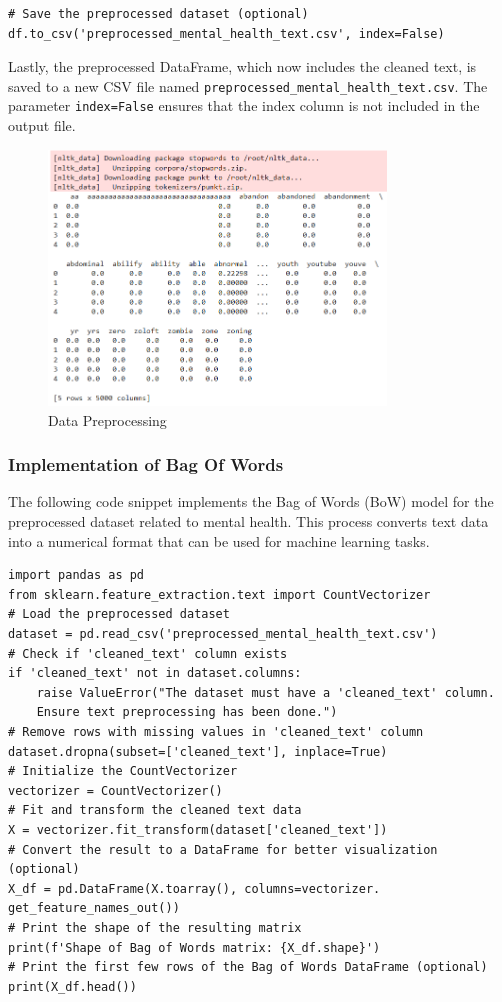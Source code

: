 \begin{verbatim}
# Save the preprocessed dataset (optional)
df.to_csv('preprocessed_mental_health_text.csv', index=False)
\end{verbatim}

\noindent
Lastly, the preprocessed DataFrame, which now includes the cleaned text, is saved to a new CSV file named \texttt{preprocessed\_mental\_health\_text.csv}. The parameter \texttt{index=False} ensures that the index column is not included in the output file.

\begin{figure}[h!]  
    \centering
    \includegraphics[width=0.8\textwidth]{Images/Output Data Preprocessing.png}  
    \caption{Data Preprocessing}
    \label{Data Preprocessing}  %
\end{figure}

\subsubsection{Implementation of Bag Of Words}

\noindent
The following code snippet implements the Bag of Words (BoW) model for the preprocessed dataset related to mental health. This process converts text data into a numerical format that can be used for machine learning tasks.

\begin{verbatim}
import pandas as pd
from sklearn.feature_extraction.text import CountVectorizer
# Load the preprocessed dataset
dataset = pd.read_csv('preprocessed_mental_health_text.csv')
# Check if 'cleaned_text' column exists
if 'cleaned_text' not in dataset.columns:
    raise ValueError("The dataset must have a 'cleaned_text' column. 
    Ensure text preprocessing has been done.")
# Remove rows with missing values in 'cleaned_text' column
dataset.dropna(subset=['cleaned_text'], inplace=True)
# Initialize the CountVectorizer
vectorizer = CountVectorizer()
# Fit and transform the cleaned text data
X = vectorizer.fit_transform(dataset['cleaned_text'])
# Convert the result to a DataFrame for better visualization (optional)
X_df = pd.DataFrame(X.toarray(), columns=vectorizer.
get_feature_names_out())
# Print the shape of the resulting matrix
print(f'Shape of Bag of Words matrix: {X_df.shape}')
# Print the first few rows of the Bag of Words DataFrame (optional)
print(X_df.head())
\end{verbatim}

